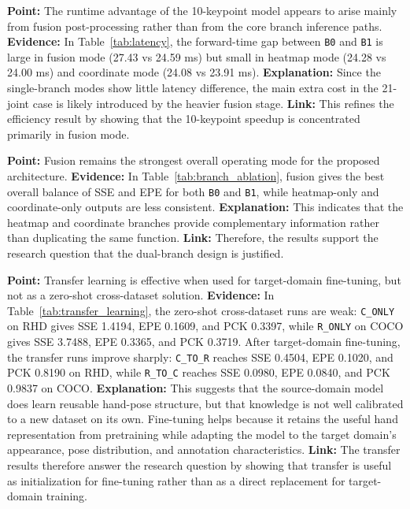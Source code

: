 \documentclass[10pt,letterpaper]{article}
\begin{document}
\medskip
\noindent\textbf{Point:} The runtime advantage of the 10-keypoint model appears to arise mainly from fusion post-processing rather than from the core branch inference paths.
\textbf{Evidence:} In Table~\ref{tab:latency}, the forward-time gap between \texttt{B0} and \texttt{B1} is large in fusion mode (27.43 vs 24.59 ms) but small in heatmap mode (24.28 vs 24.00 ms) and coordinate mode (24.08 vs 23.91 ms).
\textbf{Explanation:} Since the single-branch modes show little latency difference, the main extra cost in the 21-joint case is likely introduced by the heavier fusion stage.
\textbf{Link:} This refines the efficiency result by showing that the 10-keypoint speedup is concentrated primarily in fusion mode.

\medskip
\noindent\textbf{Point:} Fusion remains the strongest overall operating mode for the proposed architecture.
\textbf{Evidence:} In Table~\ref{tab:branch_ablation}, fusion gives the best overall balance of SSE and EPE for both \texttt{B0} and \texttt{B1}, while heatmap-only and coordinate-only outputs are less consistent.
\textbf{Explanation:} This indicates that the heatmap and coordinate branches provide complementary information rather than duplicating the same function.
\textbf{Link:} Therefore, the results support the research question that the dual-branch design is justified.

\medskip
\noindent\textbf{Point:} Transfer learning is effective when used for target-domain fine-tuning, but not as a zero-shot cross-dataset solution.
\textbf{Evidence:} In Table~\ref{tab:transfer_learning}, the zero-shot cross-dataset runs are weak: \texttt{C\_ONLY} on RHD gives SSE 1.4194, EPE 0.1609, and PCK 0.3397, while \texttt{R\_ONLY} on COCO gives SSE 3.7488, EPE 0.3365, and PCK 0.3719. After target-domain fine-tuning, the transfer runs improve sharply: \texttt{C\_TO\_R} reaches SSE 0.4504, EPE 0.1020, and PCK 0.8190 on RHD, while \texttt{R\_TO\_C} reaches SSE 0.0980, EPE 0.0840, and PCK 0.9837 on COCO.
\textbf{Explanation:} This suggests that the source-domain model does learn reusable hand-pose structure, but that knowledge is not well calibrated to a new dataset on its own. Fine-tuning helps because it retains the useful hand representation from pretraining while adapting the model to the target domain's appearance, pose distribution, and annotation characteristics.
\textbf{Link:} The transfer results therefore answer the research question by showing that transfer is useful as initialization for fine-tuning rather than as a direct replacement for target-domain training.
\end{document}
